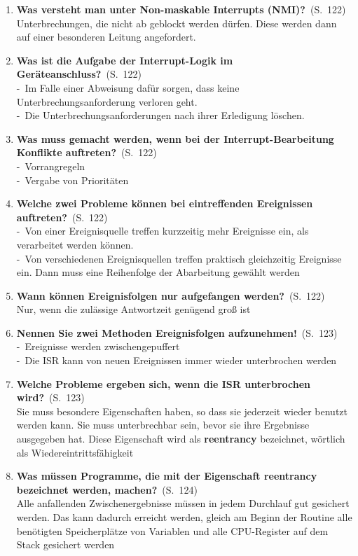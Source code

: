 \documentclass[a4paper,12pt]{article}
\newcommand{\question}[3]{\pagebreak[3]\item {\textbf{#1?}}\ (S.\ #2)#3}
\newcommand{\statement}[3]{\pagebreak[3]\item {\textbf{#1!}}\ (S.\ #2)#3}
\newcommand{\catchword}[1]{\\-\ #1}
\newcommand{\normaltext}[1]{\\#1}
\newcommand{\page}[1]{#1}
\newcommand{\important}[1]{\textbf{#1}}
\begin{document}
\begin{enumerate}
  \question{Was versteht man unter Non-maskable Interrupts (NMI)}{\page{122}}
  {
    \normaltext{Unterbrechungen, die nicht ab geblockt werden dürfen. Diese werden dann auf einer 
                besonderen Leitung angefordert.}
  }

  \question{Was ist die Aufgabe der Interrupt-Logik im Geräteanschluss}{\page{122}}
  {
    \catchword{Im Falle einer Abweisung dafür sorgen, dass keine Unterbrechungsanforderung verloren geht.}
    \catchword{Die Unterbrechungsanforderungen nach ihrer Erledigung löschen.}
  }

  \question{Was muss gemacht werden, wenn bei der Interrupt-Bearbeitung
            Konflikte auftreten}{\page{122}}
  {
    \catchword{Vorrangregeln}
    \catchword{Vergabe von Prioritäten}
  }

  \question{Welche zwei Probleme können bei eintreffenden Ereignissen auftreten}{\page{122}}
  {
    \catchword{Von einer Ereignisquelle treffen kurzzeitig mehr Ereignisse ein,
               als verarbeitet werden können. }
    \catchword{Von verschiedenen Ereignisquellen treffen praktisch gleichzeitig Ereignisse ein.
               Dann muss eine Reihenfolge der Abarbeitung gewählt werden}
  }

  \question{Wann können Ereignisfolgen nur aufgefangen werden}{\page{122}}
  {
    \normaltext{Nur, wenn die zulässige Antwortzeit genügend groß ist}
  }

  \statement{Nennen Sie zwei Methoden Ereignisfolgen aufzunehmen}{\page{123}}
  {
    \catchword{Ereignisse werden zwischengepuffert}
    \catchword{Die ISR kann von neuen Ereignissen immer wieder unterbrochen werden}
  }

  \question{Welche Probleme ergeben sich, wenn die ISR unterbrochen wird}{\page{123}}
  {
    \normaltext{Sie muss besondere Eigenschaften haben, so dass sie jederzeit wieder
                benutzt werden kann. Sie muss unterbrechbar sein, bevor sie ihre
                Ergebnisse ausgegeben hat. Diese Eigenschaft wird als \important{reentrancy}
                bezeichnet, wörtlich als Wiedereintrittsfähigkeit}
  }

  \question{Was müssen Programme, die mit der Eigenschaft reentrancy
            bezeichnet werden, machen}{\page{124}}
  {
    \normaltext{Alle anfallenden Zwischenergebnisse müssen in jedem Durchlauf gut
                gesichert werden. Das kann dadurch erreicht werden, gleich am Beginn
                der Routine alle benötigten Speicherplätze von Variablen und alle
                CPU-Register auf dem Stack gesichert werden}
  }


\end{enumerate}
\end{document}
